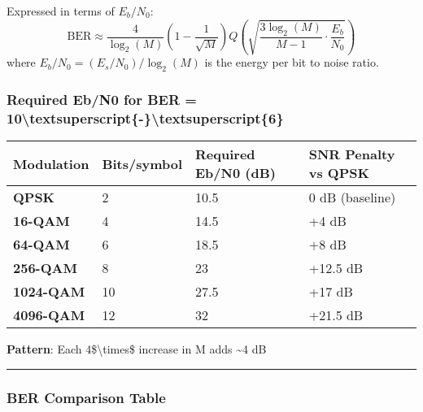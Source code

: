 Expressed in terms of $E_b/N_0$:
\begin{equation}
\text{BER} \approx \frac{4}{\log_2(M)}\left(1 - \frac{1}{\sqrt{M}}\right) Q\left(\sqrt{\frac{3\log_2(M)}{M-1} \cdot \frac{E_b}{N_0}}\right)
\label{eq:qam-ber-eb}
\end{equation}
where $E_b/N_0 = (E_s/N_0) / \log_2(M)$ is the energy per bit to noise ratio.

\subsubsection{Required Eb/N0 for BER =
10\textbackslash textsuperscript\{-\}\textbackslash textsuperscript\{6\}}\label{required-ebn0-for-ber-10ux2076}

{\def\LTcaptype{} %
\begin{longtable}[]{@{}llll@{}}
\toprule\noalign{}
Modulation & Bits/symbol & Required Eb/N0 (dB) & SNR Penalty vs QPSK \\
\midrule\noalign{}
\endhead
\bottomrule\noalign{}
\endlastfoot
\textbf{QPSK} & 2 & 10.5 & 0 dB (baseline) \\
\textbf{16-QAM} & 4 & 14.5 & +4 dB \\
\textbf{64-QAM} & 6 & 18.5 & +8 dB \\
\textbf{256-QAM} & 8 & 23 & +12.5 dB \\
\textbf{1024-QAM} & 10 & 27.5 & +17 dB \\
\textbf{4096-QAM} & 12 & 32 & +21.5 dB \\
\end{longtable}
}

\textbf{Pattern}: Each 4\$\textbackslash times\$ increase in M adds
\textasciitilde4 dB

\begin{center}\rule{0.5\linewidth}{0.5pt}\end{center}

\subsubsection{BER Comparison Table}\label{ber-comparison-table}


